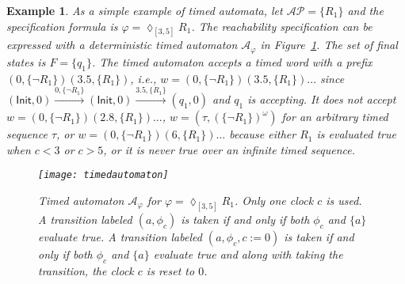 \documentclass[letterpaper, 10 pt, conference]{ieeeconf}
\newtheorem{example}{Example}
\newcommand{\calA}{\mathcal{A}}
\newcommand{\calAP}{\mathcal{AP}}
\newcommand{\init}{\mathsf{Init}}
\begin{document}
\begin{example}
As a simple example of timed automata, let $\calAP=\{R_1\}$ and 
the specification formula is $ \varphi = \lozenge_{[3,5]} R_1$. The
reachability specification can be expressed with a deterministic timed
automaton $\calA_\varphi$ in Figure~\ref{fig:reach}. The set of final
states is $F=\{q_1\}$.  The timed automaton accepts a timed word with
a prefix $(0, \{\neg R_1\})(3.5, \{R_1\})$, i.e.,
$w = (0, \{\neg R_1\}) (3.5, \{R_1\}) \ldots $ since
$(\init,0)\xrightarrow{0, \{\neg R_1\}}(\init,0) \xrightarrow{3.5,
  \{R_1\}} (q_1,0)$
and $q_1$ is accepting. It does not accept
$w= (0, \{\neg R_1\}) (2.8,\{R_1\}) \ldots$,
$w=(\tau, (\{\neg R_1\})^\omega )$ for an arbitrary timed sequence
$\tau$, or $w=(0, \{\neg R_1\})(6,\{R_1\})\ldots$ because either $R_1$
is evaluated true when $c<3$ or $c > 5$, or it is never true over an
infinite timed sequence.
\begin{figure}[h]
\centering
\texttt{[image: timedautomaton]}
\caption{Timed automaton $\calA_\varphi$ for
  $\varphi = \lozenge_{[3,5]} R_1$. Only one clock $c$ is used. A
  transition labeled $(a, \phi_c)$ is taken if and only if both
  $\phi_c$ and $\{a \}$ evaluate true. A transition labeled
  $(a, \phi_c,c:=0)$ is taken if and only if both $\phi_c$ and
  $\{a\} $ evaluate true and along with taking the transition, the
  clock $c$ is reset to $0$.}
\label{fig:reach}
\end{figure}
\end{example}
\end{document}
